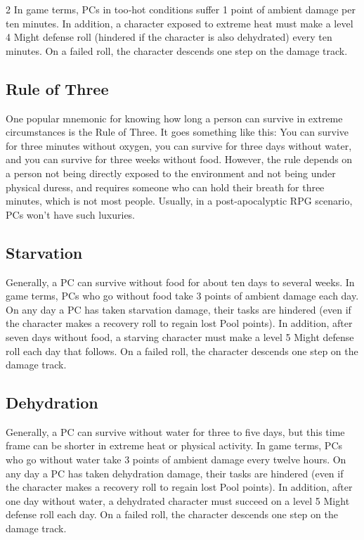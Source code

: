 \begin{multicols}{2}
In game terms, PCs in too‑hot conditions suffer 1 point of ambient damage per ten minutes. In addition, a character exposed to extreme heat must make a level 4 Might defense roll (hindered if the character is also dehydrated) every ten minutes. On a failed roll, the character descends one step on the damage track.

\subsection{Rule of Three}

One popular mnemonic for knowing how long a person can survive in extreme circumstances is the Rule of Three. It goes something like this: You can survive for three minutes without oxygen, you can survive for three days without water, and you can survive for three weeks without food. However, the rule depends on a person not being directly exposed to the environment and not being under physical duress, and requires someone who can hold their breath for three minutes, which is not most people. Usually, in a post‑apocalyptic RPG scenario, PCs won’t have such luxuries.

\subsection{Starvation}

Generally, a PC can survive without food for about ten days to several weeks. In game terms, PCs who go without food take 3 points of ambient damage each day. On any day a PC has taken starvation damage, their tasks are hindered (even if the character makes a recovery roll to regain lost Pool points). In addition, after seven days without food, a starving character must make a level 5 Might defense roll each day that follows. On a failed roll, the character descends one step on the damage track.

\subsection{Dehydration}

Generally, a PC can survive without water for three to five days, but this time frame can be shorter in extreme heat or physical activity. In game terms, PCs who go without water take 3 points of ambient damage every twelve hours. On any day a PC has taken dehydration damage, their tasks are hindered (even if the character makes a recovery roll to regain lost Pool points). In addition, after one day without water, a dehydrated character must succeed on a level 5 Might defense roll each day. On a failed roll, the character descends one step on the damage track.


\end{multicols}
